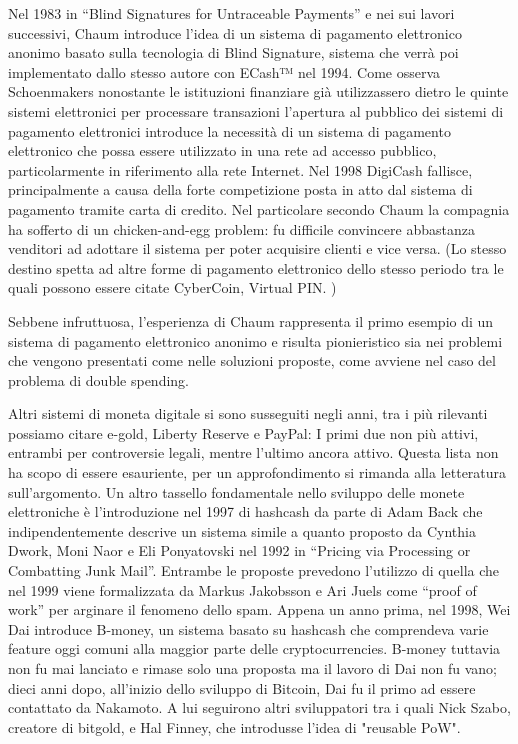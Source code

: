 Nel 1983 in “Blind Signatures for Untraceable Payments” e nei sui lavori successivi\cite{K6,K7}, Chaum introduce l’idea di un sistema di pagamento elettronico anonimo basato sulla tecnologia di Blind Signature, sistema che verrà poi implementato dallo stesso autore con ECash™ nel 1994. Come osserva Schoenmakers\cite{K8} nonostante le istituzioni finanziare già utilizzassero dietro le quinte sistemi elettronici per processare transazioni l’apertura al pubblico dei sistemi di pagamento elettronici introduce la necessità di un sistema di pagamento elettronico che possa essere utilizzato in una rete ad accesso pubblico, particolarmente in riferimento alla rete Internet. Nel 1998 DigiCash fallisce, principalmente a causa della forte competizione posta in atto dal sistema di pagamento tramite carta di credito. Nel particolare secondo Chaum la compagnia ha sofferto di un chicken-and-egg problem: fu difficile convincere abbastanza venditori  ad adottare il sistema per  poter acquisire clienti e vice versa. (Lo stesso destino spetta ad altre forme di pagamento elettronico dello stesso periodo tra le quali possono essere citate CyberCoin, Virtual PIN. ) 


Sebbene infruttuosa, l’esperienza di Chaum rappresenta il primo esempio di un sistema di pagamento elettronico anonimo e risulta pionieristico sia nei problemi che vengono presentati come nelle soluzioni proposte, come avviene nel caso del problema di double spending. 


Altri sistemi di moneta digitale si sono susseguiti negli anni, tra i più rilevanti possiamo citare e-gold, Liberty Reserve e PayPal: I primi due non più attivi, entrambi per controversie legali, mentre l’ultimo ancora attivo. Questa lista non ha scopo di essere esauriente, per un approfondimento si rimanda alla letteratura sull’argomento.
Un altro tassello fondamentale nello sviluppo delle monete elettroniche è l’introduzione nel 1997 di hashcash\cite{K9} da parte di Adam Back che indipendentemente descrive un sistema simile a quanto proposto da Cynthia Dwork,  Moni Naor e Eli Ponyatovski nel 1992 in “Pricing via Processing or Combatting Junk Mail”\cite{K10}. Entrambe le proposte prevedono l’utilizzo di quella che nel 1999 viene formalizzata da  Markus Jakobsson e Ari Juels come “proof of work” per arginare il fenomeno dello spam\cite{K11}. Appena un anno prima, nel 1998, Wei Dai introduce B-money\cite{K12}, un sistema basato su hashcash che comprendeva varie feature oggi comuni alla maggior parte delle cryptocurrencies. B-money tuttavia non fu mai lanciato e rimase solo una proposta ma il lavoro di Dai non fu vano; dieci anni dopo, all'inizio dello sviluppo di Bitcoin, Dai fu il primo ad essere contattato da Nakamoto. A lui seguirono altri sviluppatori tra i quali Nick Szabo, creatore di bitgold, e Hal Finney, che introdusse l'idea di "reusable PoW"\cite{K13}. 

